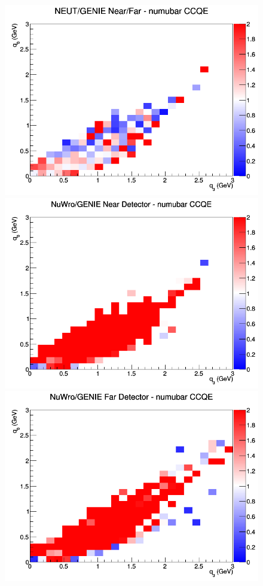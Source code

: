 \documentclass[12pt]{article}
\begin{document}
\begin{figure}[h]
\endminipage
{}
\includegraphics[width=\linewidth]{eff_q0_q3/FGT/ratios/CCQE_NEUT_GENIE_numubar_NF_q3_q0.png}
\endminipage
\newline
{}
\includegraphics[width=\linewidth]{eff_q0_q3/FGT/ratios/CCQE_NuWro_GENIE_numubar_near_q3_q0.png}
\endminipage
{}
\includegraphics[width=\linewidth]{eff_q0_q3/FGT/ratios/CCQE_NuWro_GENIE_numubar_far_q3_q0.png}

\end{figure}
\end{document}
